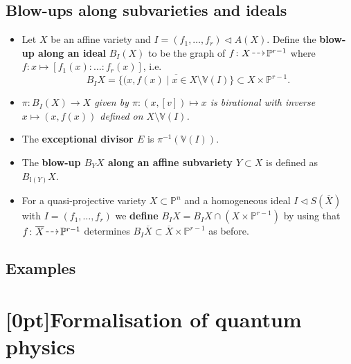 \documentclass[10pt]{article}
\newcommand{\van}{\mathbb{V}}
\newcommand{\ide}{\mathbb{I}}
\newcommand{\pee}{\mathbb{P}}
\newcommand*{\DashedArrow}[1][]{\mathbin{\tikz [baseline=-0.25ex,-latex, densely dashed,#1] \draw [#1] (0pt,0.5ex) -- (1.3em,0.5ex);}}
\newcommand{\ratmap}{{\,\DashedArrow[->]\,}}
\newcommand{\QI}{\textcolor{pink}{QI}}
\begin{document}
        \subsection{Blow-ups along subvarieties and ideals}

            \begin{itemize}
                \item Let $X$ be an affine variety and $I=(f_1,\ldots,f_r)\triangleleft A(X)$.
                    Define the \textbf{blow-up along an ideal} $B_I(X)$ to be the graph of $f\colon X\ratmap\pee^{r-1}$ where $f\colon x\mapsto[f_1(x):\ldots:f_r(x)]$, i.e.
                    \begin{equation*}
                        B_IX = \overline{\big\{(x,f(x)\mid x\in X\setminus\van(I)\big\}}\subset X\times\pee^{r-1}.
                    \end{equation*}
                \item \emph{$\pi\colon B_I(X)\to X$ given by $\pi\colon(x,[v])\mapsto x$ is birational with inverse $x\mapsto(x,f(x))$ defined on $X\setminus\van(I)$.}
                \item The \textbf{exceptional divisor $E$} is $\pi^{-1}(\van(I))$.
                \item The \textbf{blow-up $B_YX$ along an affine subvariety $Y\subset X$} is defined as $B_{\ide(Y)}X$.
                \item For a quasi-projective variety $X\subset\pee^n$ and a homogeneous ideal $I\triangleleft S(\overline{X})$ with $I=(f_1,\ldots,f_r)$ we \textbf{define} $B_IX=B_IX\cap(X\times\pee^{r-1})$ by using that $f\colon\overline{X}\ratmap\pee^{r-1}$ determines $B_I\overline{X}\subset\overline{X}\times\pee^{r-1}$ as before.
            \end{itemize}

        \subsection{Examples}



    \clearpage

    \section{\protect\marginnote{\QI}[0pt]Formalisation of quantum physics}
\end{document}
